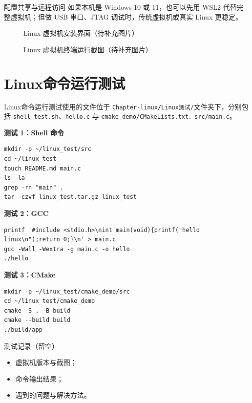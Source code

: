 \begin{anybox}{配置共享与远程访问}
如果本机是 Windows 10 或 11，也可以先用 WSL2 代替完整虚拟机；但做 USB 串口、JTAG 调试时，传统虚拟机或真实 Linux 更稳定。
\end{anybox}

\begin{figure}[htbp]
\centering
\caption{Linux 虚拟机安装界面（待补充图片）} \label{fig:linux-vm-install}
\end{figure}

\begin{figure}[htbp]
\centering
\caption{Linux 虚拟机终端运行截图（待补充图片）} \label{fig:linux-vm-terminal}
\end{figure}
\section{Linux命令运行测试}

Linux命令运行测试使用的文件位于 \texttt{Chapter-linux/Linux测试/}文件夹下，分别包括 \texttt{shell\_test.sh}、\texttt{hello.c} 与 \texttt{cmake\_demo/CMakeLists.txt、src/main.c}。

\noindent\textbf{测试 1：Shell 命令}

\begin{lstlisting}
mkdir -p ~/linux_test/src
cd ~/linux_test
touch README.md main.c
ls -la
grep -rn "main" .
tar -czvf linux_test.tar.gz linux_test
\end{lstlisting}
\noindent\textbf{测试 2：GCC}

\begin{lstlisting}
printf '#include <stdio.h>\nint main(void){printf("hello linux\n");return 0;}\n' > main.c
gcc -Wall -Wextra -g main.c -o hello
./hello
\end{lstlisting}
\noindent\textbf{测试 3：CMake}

\begin{lstlisting}
mkdir -p ~/linux_test/cmake_demo/src
cd ~/linux_test/cmake_demo
cmake -S . -B build
cmake --build build
./build/app
\end{lstlisting}
\begin{anybox}{测试记录（留空）}
\begin{itemize}
\item 虚拟机版本与截图；
\item 命令输出结果；
\item 遇到的问题与解决方法。
\end{itemize}
\end{anybox}

